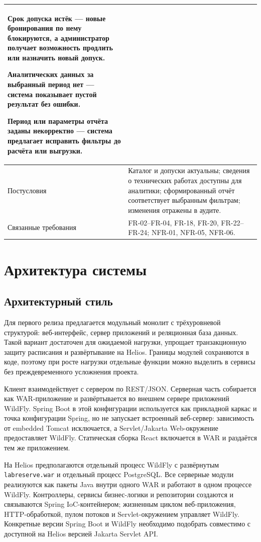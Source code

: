 \documentclass[12pt,a4paper]{article}
\begin{document}
\begin{longtable}{|p{}|p{}|}
\begin{ucalts}
    \item Срок допуска истёк --- новые бронирования по нему блокируются, а администратор получает возможность продлить или назначить новый допуск.
    \item Аналитических данных за выбранный период нет --- система показывает пустой результат без ошибки.
    \item Период или параметры отчёта заданы некорректно --- система предлагает исправить фильтры до расчёта или выгрузки.
\end{ucalts} \\
\hline
Постусловия & Каталог и допуски актуальны; сведения о технических работах доступны для
аналитики; сформированный отчёт соответствует выбранным фильтрам; изменения отражены в аудите. \\
\hline
Связанные требования & FR-02--FR-04, FR-18, FR-20, FR-22--FR-24; NFR-01, NFR-05, NFR-06. \\
\hline
\end{longtable}
\endgroup

\clearpage
\section{Архитектура системы}

\subsection{Архитектурный стиль}

Для первого релиза предлагается модульный монолит с трёхуровневой структурой:
веб-интерфейс, сервер приложений и реляционная база данных. Такой вариант
достаточен для ожидаемой нагрузки, упрощает транзакционную защиту расписания и
развёртывание на Helios. Границы модулей сохраняются в коде, поэтому при росте
нагрузки отдельные функции можно выделить в сервисы без преждевременного
усложнения проекта.

Клиент взаимодействует с сервером по REST/JSON. Серверная часть
собирается как WAR-приложение и развёртывается во внешнем сервере приложений
WildFly. Spring Boot в этой конфигурации используется как прикладной каркас и
точка конфигурации Spring, но не запускает встроенный веб-сервер: зависимость от
embedded Tomcat исключается, а Servlet/Jakarta Web-окружение предоставляет
WildFly. Статическая сборка React включается в WAR и раздаётся тем же
приложением.

На Helios предполагаются отдельный процесс WildFly с развёрнутым
\texttt{labreserve.war} и отдельный процесс PostgreSQL. Все серверные модули
реализуются как пакеты Java внутри одного WAR и работают в одном процессе
WildFly. Контроллеры, сервисы бизнес-логики и репозитории создаются и
связываются Spring IoC-контейнером; жизненным циклом веб-приложения,
HTTP-обработкой, пулом потоков и Servlet-окружением управляет WildFly.
Конкретные версии Spring Boot и WildFly необходимо подобрать совместимо с
доступной на Helios версией Jakarta Servlet API.
\end{document}
